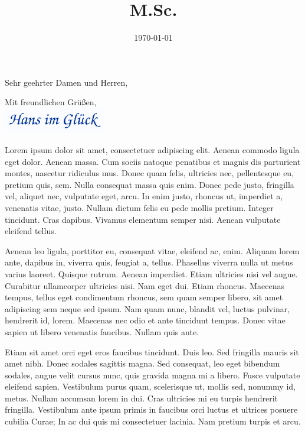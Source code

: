 \documentclass[11pt,a4paper]{moderncv}
\title{M.Sc.}                               %
\begin{document}


\date{\today}
\opening{Sehr geehrter Damen und Herren,}
\closing{Mit freundlichen Grüßen, \vspace{0,3cm} \\ \includegraphics[width=4.5cm]{unterschrift.png} \vspace{-1,0cm}}
\makelettertitle

Lorem ipsum dolor sit amet, consectetuer adipiscing elit. Aenean commodo ligula eget dolor. Aenean massa. Cum sociis natoque penatibus et magnis dis parturient montes, nascetur ridiculus mus. Donec quam felis, ultricies nec, pellentesque eu, pretium quis, sem. Nulla consequat massa quis enim. Donec pede justo, fringilla vel, aliquet nec, vulputate eget, arcu. In enim justo, rhoncus ut, imperdiet a, venenatis vitae, justo. Nullam dictum felis eu pede mollis pretium. Integer tincidunt. Cras dapibus. Vivamus elementum semper nisi. Aenean vulputate eleifend tellus.

Aenean leo ligula, porttitor eu, consequat vitae, eleifend ac, enim. Aliquam lorem ante, dapibus in, viverra quis, feugiat a, tellus. Phasellus viverra nulla ut metus varius laoreet. Quisque rutrum. Aenean imperdiet. Etiam ultricies nisi vel augue. Curabitur ullamcorper ultricies nisi. Nam eget dui. Etiam rhoncus. Maecenas tempus, tellus eget condimentum rhoncus, sem quam semper libero, sit amet adipiscing sem neque sed ipsum. Nam quam nunc, blandit vel, luctus pulvinar, hendrerit id, lorem. Maecenas nec odio et ante tincidunt tempus. Donec vitae sapien ut libero venenatis faucibus. Nullam quis ante.

Etiam sit amet orci eget eros faucibus tincidunt. Duis leo. Sed fringilla mauris sit amet nibh. Donec sodales sagittis magna. Sed consequat, leo eget bibendum sodales, augue velit cursus nunc, quis gravida magna mi a libero. Fusce vulputate eleifend sapien. Vestibulum purus quam, scelerisque ut, mollis sed, nonummy id, metus. Nullam accumsan lorem in dui. Cras ultricies mi eu turpis hendrerit fringilla. Vestibulum ante ipsum primis in faucibus orci luctus et ultrices posuere cubilia Curae; In ac dui quis mi consectetuer lacinia. Nam pretium turpis et arcu.
\end{document}
